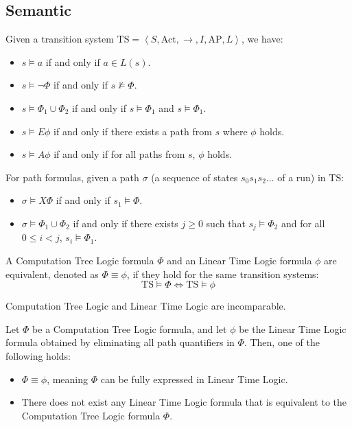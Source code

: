 \subsection{Semantic}
Given a transition system $\text{TS}=\left\langle S, \text{Act}, \rightarrow, I,\text{AP}, L\right\rangle$, we have: 
\begin{itemize}
    \item $s \models a$ if and only if $a \in L(s)$. 
    \item $s \models \lnot \Phi$ if and only if $s \not\models \Phi$.
    \item $s \models \Phi_1 \cup \Phi_2$ if and only if $s \models \Phi_1$ and $s \models \Phi_1$.
    \item $s \models E\phi$ if and only if there exists a path from $s$ where $\phi$ holds. 
    \item $s \models A\phi$  if and only if for all paths from $s$, $\phi$ holds. 
\end{itemize}
\noindent For path formulas, given a path $\sigma$ (a sequence of states $s_0s_1s_2\dots$ of a run) in $\text{TS}$: 
\begin{itemize}
    \item $\sigma \models X\Phi$ if and only if $s_1 \models \Phi$.
    \item $\sigma \models \Phi_1 \cup \Phi_2$ if and only if there exists $j\geq 0$ such that $s_j \models \Phi_2$ and for all $0 \leq i < j$, $s_i \models \Phi_1$.
\end{itemize}
\noindent A Computation Tree Logic formula $\Phi$ and an Linear Time Logic formula $\phi$ are equivalent, denoted as $\Phi\equiv\phi$, if they hold for the same transition systems: 
\[\text{TS} \models \Phi \Leftrightarrow \text{TS} \models \phi\]
\begin{theorem}
    Computation Tree Logic and Linear Time Logic are incomparable.
\end{theorem}
\begin{theorem}
    Let $\Phi$ be a Computation Tree Logic formula, and let $\phi$ be the Linear Time Logic formula obtained by eliminating all path quantifiers in $\Phi$. 
    Then, one of the following holds:
    \begin{itemize}
        \item $\Phi\equiv\phi$, meaning $\Phi$ can be fully expressed in Linear Time Logic.
        \item There does not exist any Linear Time Logic formula that is equivalent to the Computation Tree Logic formula $\Phi$.
    \end{itemize}
\end{theorem}

